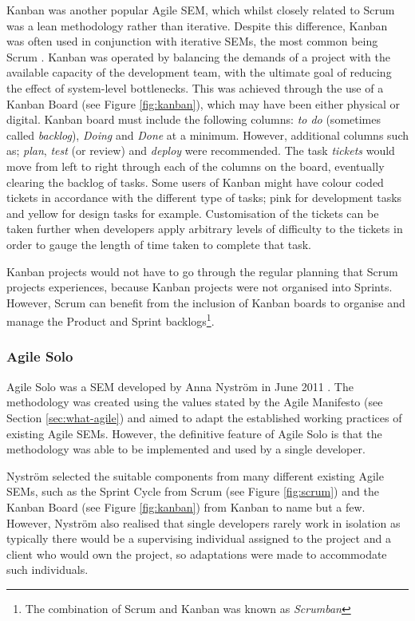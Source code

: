 \documentclass[final]{cmpreport}
\begin{document}
			Kanban was another popular Agile SEM, which whilst closely related to Scrum was a lean methodology rather than iterative. Despite this difference, Kanban was often used in conjunction with iterative SEMs, the most common being Scrum \citep{kanban}. Kanban was operated by balancing the demands of a project with the available capacity of the development team, with the ultimate goal of reducing the effect of system-level bottlenecks. This was achieved through the use of a Kanban Board (see Figure \ref{fig:kanban}), which may have been either physical or digital. Kanban board must include the following columns: \emph{to do} (sometimes called \textit{backlog}), \emph{Doing} and \emph{Done} at a minimum. However, additional columns such as; \emph{plan}, \emph{test} (or review) and \emph{deploy} were recommended. The task \emph{tickets} would move from left to right through each of the columns on the board, eventually clearing the backlog of tasks. Some users of Kanban might have colour coded tickets in accordance with the different type of tasks; pink for development tasks and yellow for design tasks for example. Customisation of the tickets can be taken further when developers apply arbitrary levels of difficulty to the tickets in order to gauge the length of time taken to complete that task. 
			
			Kanban projects would not have to go through the regular planning that Scrum projects experiences, because Kanban projects were not organised into Sprints. However, Scrum can benefit from the inclusion of Kanban boards to organise and manage the Product and Sprint backlogs\footnote{The combination of Scrum and Kanban was known as \textit{Scrumban}}.
			
			\subsubsection{Agile Solo} \label{sec:agile-solo}
			Agile Solo was a SEM developed by Anna Nystr{\"o}m in June 2011 \citep{AgileSolo}. The methodology was created using the values stated by the Agile Manifesto (see Section \ref{sec:what-agile}) and aimed to adapt the established working practices of existing Agile SEMs. However, the definitive feature of Agile Solo is that the methodology was able to be implemented and used by a single developer. 
			
			Nystr{\"o}m selected the suitable components from many different existing Agile SEMs, such as the Sprint Cycle from Scrum (see Figure \ref{fig:scrum}) and the Kanban Board (see Figure \ref{fig:kanban}) from Kanban to name but a few. However, Nystr{\"o}m also realised that single developers rarely work in isolation as typically there would be a supervising individual assigned to the project and a client who would own the project, so adaptations were made to accommodate such individuals.
			
\end{document}
